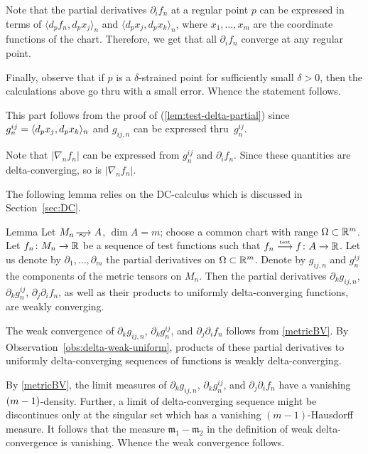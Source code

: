 Note that the partial derivatives $\partial_if_n$ at a regular point $p$ can be expressed in terms of $\langle d_pf_n,d_px_j\rangle_n$ and $\langle d_px_j,d_px_k\rangle_n$, where $x_1,\dots,x_m$ are the coordinate functions of the chart.
Therefore, we get that all $\partial_if_n$ converge at any regular point.

Finally, observe that if $p$ is a $\delta$-strained point for sufficiently small $\delta>0$,
then the calculations above go thru with a small error.
Whence the statement follows.

 This part follows from the proof of (\ref{lem:test-delta-partial}) since $g^{ij}_n\zz=\langle d_px_j,d_px_k\rangle_n$ and $g_{ij,n}$ can be expressed thru~$g^{ij}_n$.

Note that $|\nabla_n f_n|$ can be expressed from $g^{ij}_n$ and $\partial_if_n$.
Since these quantities are delta-converging, so is $|\nabla_n f_n|$.
\qeds

The following lemma relies on the DC-calculus which is discussed in Section~\ref{sec:DC}.

\begin{thm}{Lemma}\label{lem:test-delta-partial-g}
Let $M_n\smooths{} A$, $\dim A=m$;
choose a common chart with range $\Omega\subset \mathbb{R}^m$.
Let $f_n\colon M_n\to\mathbb{R}$ be a sequence of test functions such that $f_n\zz\testto f\:A\to \RR$.
Let us denote by $\partial_1,\dots,\partial_m$ the partial derivatives on $\Omega\subset \mathbb{R}^m$.
Denote by $g_{ij,n}$ and $g^{ij}_n$ the components of the metric tensors on $M_n$.
Then  the partial derivatives $\partial_kg_{ij,n}$, $\partial_k g^{ij}_n$,  $\partial_j\partial_if_n$, as well as their products to uniformly delta-converging functions,  are weakly converging.


\end{thm}

The weak convergence of $\partial_kg_{ij,n}$, $\partial_k g^{ij}_n$, and $\partial_j\partial_if_n$
follows from \ref{metricBV}.
By Observation~\ref{obs:delta-weak-uniform}, products of these partial derivatives to uniformly delta-converging sequences of functions is weakly delta-converging.

By \ref{metricBV}, the limit measures of $\partial_kg_{ij,n}$, $\partial_k g^{ij}_n$, and $\partial_j\partial_if_n$ have a vanishing $(m\zz-1)$-density.
Further, a limit of delta-converging sequence might be discontinues only at the singular set which has a vanishing $(m-1)$-Hausdorff measure.
It follows that the measure $\mathfrak{m}_1-\mathfrak{m}_2$ in the definition of weak delta-convergence is vanishing. 
Whence the weak convergence follows.
\qeds

